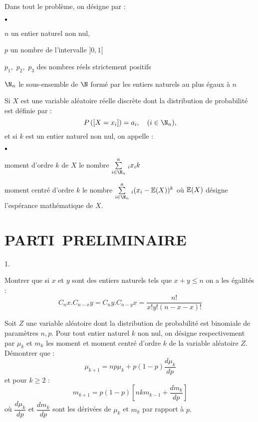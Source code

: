 \documentclass[11pt]{article}%
\begin{document}
\noindent Dans tout le problème, on désigne par :

\begin{noliste}{$\scriptstyle \bullet$}
\item $n$ un entier naturel non nul,

\item $p$ un nombre de l'intervalle $]0,1[$

\item $p_{1},$ $p_{2},$ $p_{3}$ des nombres réels strictement positifs

\item $\N_{n}$ le sous-ensemble de $\N$ formé par les
entiers naturels au plus égaux à $n$
\end{noliste}

\noindent Si $X$ est une variable aléatoire réelle discrète dont la
distribution de probabilité est définie par :
\[
P\left(\Ev{X = x_{i}}\right) = a_{i},\quad (i\in \N_{n}),
\]
et si $k$ est un entier naturel non nul, on appelle :

\begin{noliste}{$\scriptstyle \bullet$}
\item moment d'ordre $k$ de $X$ le nombre $\Sum{i\in
\N_{n}}a_{i}x_{i}{k}$

\item moment centré d'ordre $k$ le nombre $\Sum{i\in
\N_{n}}a_{i}(x_{i}-\E(X))^{k}$ où $\mathbb{E}(X)$ désigne l'espérance
mathématique de $X.
$
\end{noliste}

\section*{PARTI\E\ PRELIMINAIRE}

\begin{noliste}{1.}
 \setlength{\itemsep}{4mm}
\item Montrer que si $x$ et $y$ sont des entiers naturels tels que $x +
y\leq n$ on a les égalités :
\[
C_{n}{x}.C_{n-x}{y} = C_{n}{y}.C_{n-y}{x} = \dfrac{n!}{x!y!(n-x-x)!}
\]

\item Soit $Z$ une variable aléatoire dont la distribution de
probabilité
est binomiale de paramètres $n,p.$ Pour tout entier naturel $k$ non
nul, on désigne respectivement par $\mu_{k}$ et $m_{k}$ les moment et
moment centré
d'ordre $k$ de la variable aléatoire $Z.$\\
Démontrer que :
\[
\mu_{k + 1} = np\mu_{k} + p(1-p)\dfrac{d\mu_{k}}{dp}
\]
et pour $k\geq 2$ :
\[
m_{k + 1} = p(1-p)\left[ nkm_{k-1} + \dfrac{dm_{k}}{dp}\right] 
\]
où $\dfrac{d\mu_{k}}{dp}$ et $\dfrac{dm_{k}}{dp}$ sont les dérivées de
$\mu
_{k}$ et $m_{k}$ par rapport à $p.$
\end{noliste}
\end{document}
